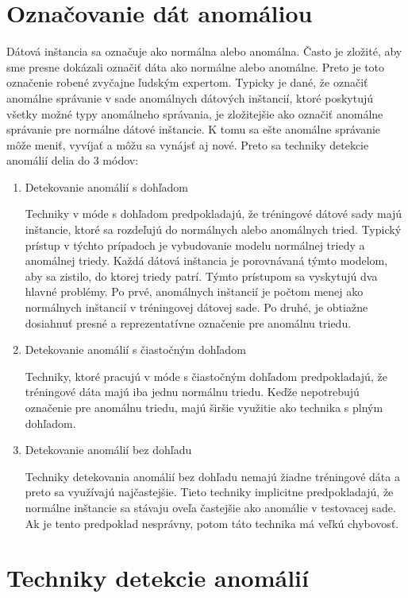 \section{Označovanie dát anomáliou}  \label{Oznacovanie}
Dátová inštancia sa označuje ako normálna alebo anomálna. Často je zložité, aby sme presne dokázali označiť dáta ako normálne alebo anomálne. Preto je toto označenie robené zvyčajne ľudským expertom. Typicky je dané, že  označiť anomálne správanie v  sade anomálnych dátových inštancií, ktoré poskytujú všetky možné typy anomálneho správania, je zložitejšie ako označiť anomálne správanie pre normálne dátové inštancie. K tomu sa ešte  anomálne správanie môže meniť, vyvíjať a môžu sa vynájsť aj nové. Preto sa techniky detekcie anomálií delia do 3 módov:
\begin{enumerate}
    \item Detekovanie anomálií s dohľadom\par
    Techniky v móde s dohľadom predpokladajú, že tréningové dátové sady majú inštancie, ktoré sa rozdeľujú do normálnych alebo anomálnych tried. Typický prístup v týchto prípadoch je vybudovanie modelu normálnej triedy a anomálnej triedy. Každá dátová inštancia je porovnávaná týmto modelom, aby sa zistilo, do ktorej triedy patrí. Týmto prístupom sa vyskytujú dva hlavné problémy. Po prvé, anomálnych inštancií je počtom menej ako normálnych inštancií v tréningovej dátovej sade. Po druhé, je obtiažne  dosiahnuť presné a reprezentatívne označenie pre anomálnu triedu.
    \item Detekovanie anomálií s čiastočným dohľadom\par
    Techniky, ktoré pracujú v móde s čiastočným dohľadom predpokladajú, že tréningové dáta majú iba jednu normálnu triedu. Keďže nepotrebujú označenie pre anomálnu triedu, majú širšie využitie ako technika s plným dohľadom.
    \item Detekovanie anomálií bez dohľadu\par
    Techniky detekovania anomálií bez dohľadu nemajú žiadne tréningové dáta a preto sa využívajú najčastejšie. Tieto techniky implicitne predpokladajú, že normálne inštancie sa stávaju oveľa častejšie ako anomálie v testovacej sade. Ak je tento predpoklad nesprávny, potom táto technika má veľkú chybovosť.
    
\end{enumerate}\cite{Chandola}

\section{Techniky detekcie anomálií}
